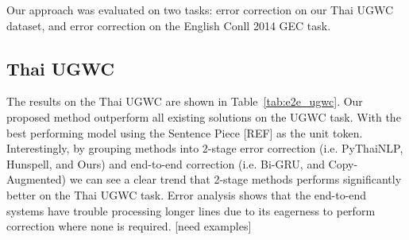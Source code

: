 Our approach was evaluated on two tasks: error correction on our Thai UGWC dataset, and error correction on the English Conll 2014 GEC task.

\subsection{Thai UGWC}

The results on the Thai UGWC are shown in Table~\ref{tab:e2e_ugwc}. Our proposed method outperform all existing solutions on the UGWC task. With the best performing model using the Sentence Piece [REF] as the unit token. Interestingly, by grouping methods into 2-stage error correction (i.e. PyThaiNLP, Hunspell, and Ours) and end-to-end correction (i.e. Bi-GRU, and Copy-Augmented) we can see a clear trend that 2-stage methods performs significantly better on the Thai UGWC task. Error analysis shows that the end-to-end systems have trouble processing longer lines due to its eagerness to perform correction where none is required. [need examples]

